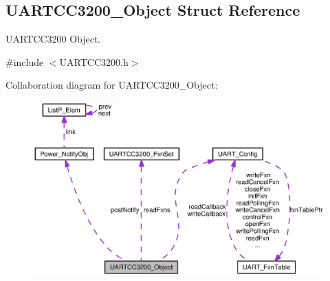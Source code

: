 \subsection{U\+A\+R\+T\+C\+C3200\+\_\+\+Object Struct Reference}
\label{struct_u_a_r_t_c_c3200___object}


U\+A\+R\+T\+C\+C3200 Object.  




{\ttfamily \#include $<$U\+A\+R\+T\+C\+C3200.\+h$>$}



Collaboration diagram for U\+A\+R\+T\+C\+C3200\+\_\+\+Object\+:
\nopagebreak
\begin{figure}[H]
\begin{center}
\leavevmode
\includegraphics[width=350pt]{struct_u_a_r_t_c_c3200___object__coll__graph}
\end{center}
\end{figure}
